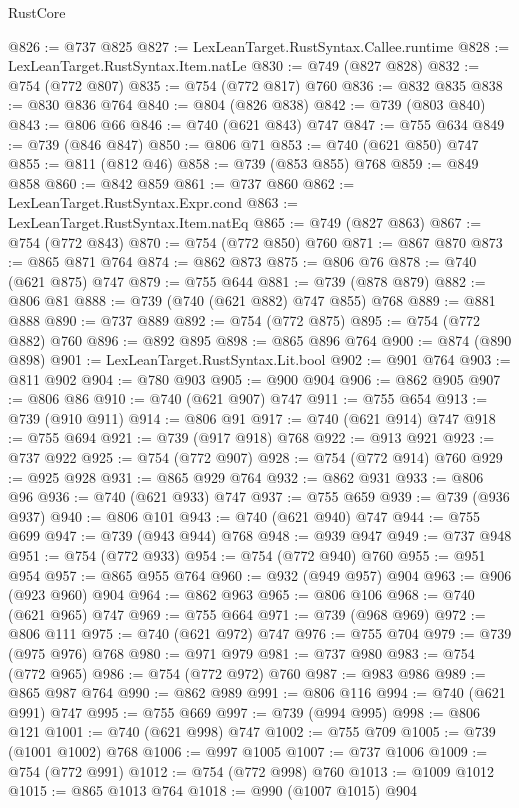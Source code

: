 \begin{lexlean}{RustCore}
\begin{coremodule}
@826 := @737 @825
@827 := LexLeanTarget.RustSyntax.Callee.runtime
@828 := LexLeanTarget.RustSyntax.Item.natLe
@830 := @749 (@827 @828)
@832 := @754 (@772 @807)
@835 := @754 (@772 @817) @760
@836 := @832 @835
@838 := @830 @836 @764
@840 := @804 (@826 @838)
@842 := @739 (@803 @840)
@843 := @806 @66
@846 := @740 (@621 @843) @747
@847 := @755 @634
@849 := @739 (@846 @847)
@850 := @806 @71
@853 := @740 (@621 @850) @747
@855 := @811 (@812 @46)
@858 := @739 (@853 @855) @768
@859 := @849 @858
@860 := @842 @859
@861 := @737 @860
@862 := LexLeanTarget.RustSyntax.Expr.cond
@863 := LexLeanTarget.RustSyntax.Item.natEq
@865 := @749 (@827 @863)
@867 := @754 (@772 @843)
@870 := @754 (@772 @850) @760
@871 := @867 @870
@873 := @865 @871 @764
@874 := @862 @873
@875 := @806 @76
@878 := @740 (@621 @875) @747
@879 := @755 @644
@881 := @739 (@878 @879)
@882 := @806 @81
@888 := @739 (@740 (@621 @882) @747 @855) @768
@889 := @881 @888
@890 := @737 @889
@892 := @754 (@772 @875)
@895 := @754 (@772 @882) @760
@896 := @892 @895
@898 := @865 @896 @764
@900 := @874 (@890 @898)
@901 := LexLeanTarget.RustSyntax.Lit.bool
@902 := @901 @764
@903 := @811 @902
@904 := @780 @903
@905 := @900 @904
@906 := @862 @905
@907 := @806 @86
@910 := @740 (@621 @907) @747
@911 := @755 @654
@913 := @739 (@910 @911)
@914 := @806 @91
@917 := @740 (@621 @914) @747
@918 := @755 @694
@921 := @739 (@917 @918) @768
@922 := @913 @921
@923 := @737 @922
@925 := @754 (@772 @907)
@928 := @754 (@772 @914) @760
@929 := @925 @928
@931 := @865 @929 @764
@932 := @862 @931
@933 := @806 @96
@936 := @740 (@621 @933) @747
@937 := @755 @659
@939 := @739 (@936 @937)
@940 := @806 @101
@943 := @740 (@621 @940) @747
@944 := @755 @699
@947 := @739 (@943 @944) @768
@948 := @939 @947
@949 := @737 @948
@951 := @754 (@772 @933)
@954 := @754 (@772 @940) @760
@955 := @951 @954
@957 := @865 @955 @764
@960 := @932 (@949 @957) @904
@963 := @906 (@923 @960) @904
@964 := @862 @963
@965 := @806 @106
@968 := @740 (@621 @965) @747
@969 := @755 @664
@971 := @739 (@968 @969)
@972 := @806 @111
@975 := @740 (@621 @972) @747
@976 := @755 @704
@979 := @739 (@975 @976) @768
@980 := @971 @979
@981 := @737 @980
@983 := @754 (@772 @965)
@986 := @754 (@772 @972) @760
@987 := @983 @986
@989 := @865 @987 @764
@990 := @862 @989
@991 := @806 @116
@994 := @740 (@621 @991) @747
@995 := @755 @669
@997 := @739 (@994 @995)
@998 := @806 @121
@1001 := @740 (@621 @998) @747
@1002 := @755 @709
@1005 := @739 (@1001 @1002) @768
@1006 := @997 @1005
@1007 := @737 @1006
@1009 := @754 (@772 @991)
@1012 := @754 (@772 @998) @760
@1013 := @1009 @1012
@1015 := @865 @1013 @764
@1018 := @990 (@1007 @1015) @904

\end{coremodule}
\end{lexlean}
